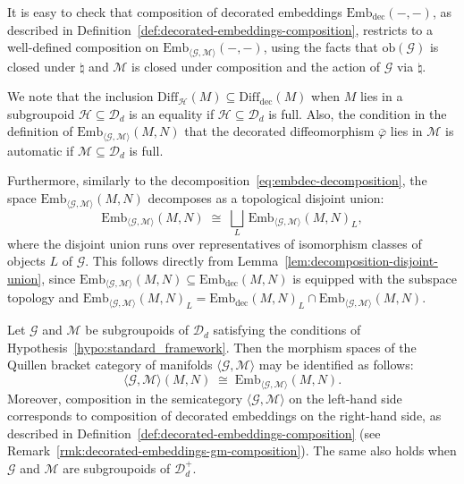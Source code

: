 \documentclass[AHL,Unicode,published]{cedram}
\newcommand{\Diff}{\mathrm{Diff}}
\newcommand{\obj}{\ensuremath{\mathrm{ob}}}
\newcommand{\rdec}{\mathrm{dec}}
\newcommand{\cD}{\mathcal{D}}
\newcommand{\cG}{\mathcal{G}}
\newcommand{\cH}{\mathcal{H}}
\newcommand{\cM}{\mathcal{M}}
\newcommand{\diffdec}{\ensuremath{\mathrm{Diff}_{\rdec}}}
\newcommand{\embdec}{\ensuremath{\mathrm{Emb}_{\rdec}}}
\newcommand{\embgm}{\ensuremath{\mathrm{Emb}_{\langle \cG,\cM \rangle}}}
\begin{document}
\begin{rema}\label{rmk:decorated-embeddings-gm-composition}
It is easy to check that composition of decorated embeddings $\embdec(-,-)$, as described in Definition~\ref{def:decorated-embeddings-composition}, restricts to a well-defined composition on $\embgm(-,-)$, using the facts that $\obj(\cG)$ is closed under $\natural$ and $\cM$ is closed under composition and the action of $\cG$ via $\natural$.
\end{rema}

\begin{rema}
We note that the inclusion $\Diff_{\cH}(M) \subseteq \diffdec(M)$ when $M$ lies in a subgroupoid $\cH \subseteq \cD_{d}$ is an equality if $\cH \subseteq \cD_{d}$ is full. Also, the condition in the definition of $\embgm(M,N)$ that the decorated diffeomorphism $\bar{\varphi}$ lies in $\cM$ is automatic if $\cM \subseteq \cD_{d}$ is full.

Furthermore, similarly to the decomposition~\eqref{eq:embdec-decomposition}, the space $\embgm(M,N)$ decomposes as a topological disjoint union:
\begin{equation}\label{eq:embgm-decomposition}
\embgm(M,N) \;\cong\; \bigsqcup_L \, \embgm(M,N)_L,
\end{equation}
where the disjoint union runs over representatives of isomorphism classes of objects $L$ of $\cG$. This follows directly from Lemma~\ref{lem:decomposition-disjoint-union}, since $\embgm(M,N) \subseteq \embdec(M,N)$ is equipped with the subspace topology and $\embgm(M,N)_L = \embdec(M,N)_L \cap \embgm(M,N)$.
\end{rema}

\begin{prop}\label{prop:morphism-spaces-bracket}
Let $\cG$ and $\cM$ be subgroupoids of $\cD_{d}$ satisfying the conditions of Hypothesis~\ref{hypo:standard_framework}. Then the morphism spaces of the Quillen bracket category of manifolds $\langle \cG, \cM \rangle$ may be identified as follows:
\begin{equation}\label{eq:morphism-spaces-bracket}
\langle \cG, \cM \rangle (M,N) \;\cong\; \embgm(M,N).
\end{equation}
Moreover, composition in the semicategory $\langle \cG, \cM \rangle$ on the left-hand side corresponds to composition of decorated embeddings on the right-hand side, as described in Definition~\ref{def:decorated-embeddings-composition} (see Remark~\ref{rmk:decorated-embeddings-gm-composition}). The same also holds when $\cG$ and $\cM$ are subgroupoids of $\cD_{d}^{+}$.
\end{prop}
\end{document}
